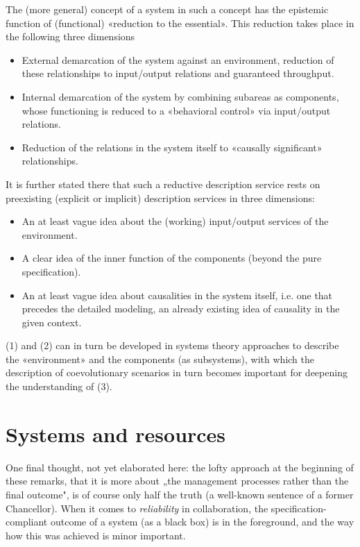 \documentclass[11pt,a4paper]{article}
\begin{document}
The (more general) concept of a system in such a concept has the epistemic
function of (functional) «reduction to the essential». This reduction takes
place in the following three dimensions
\begin{itemize}
\item [(1)] External demarcation of the system against an environment,
  reduction of these relationships to input/output relations and guaranteed
  throughput.
\item [(2)] Internal demarcation of the system by combining subareas as
  components, whose functioning is reduced to a «behavioral control» via
  input/output relations.
\item [(3)] Reduction of the relations in the system itself to «causally
  significant» relationships.
\end{itemize}
It is further stated there that such a reductive description service rests on
preexisting (explicit or implicit) description services in three dimensions:
\begin{itemize}
\item [(1)] An at least vague idea about the (working) input/output services of
  the environment.
\item [(2)] A clear idea of the inner function of the components (beyond the
  pure specification).
\item [(3)] An at least vague idea about causalities in the system itself,
  i.e. one that precedes the detailed modeling, an already existing idea of
  causality in the given context.
\end{itemize}
(1) and (2) can in turn be developed in systems theory approaches to describe
the «environment» and the components (as subsystems), with which the
description of coevolutionary scenarios in turn becomes important for
deepening the understanding of (3).

\section{Systems and resources}

One final thought, not yet elaborated here: the lofty approach at the
beginning of these remarks, that it is more about „the management processes
rather than the final outcome", is of course only half the truth (a well-known
sentence of a former Chancellor).  When it comes to \emph{reliability} in
collaboration, the specification-compliant outcome of a system (as a black
box) is in the foreground, and the way how this was achieved is minor
important.
\end{document}

